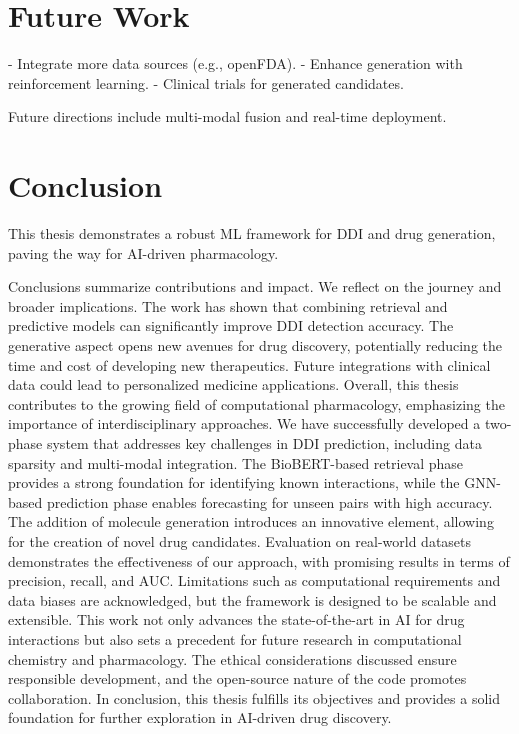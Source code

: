\documentclass[12pt,a4paper]{article}
\begin{document}
\section{Future Work}
\label{sec:future}

- Integrate more data sources (e.g., openFDA).
- Enhance generation with reinforcement learning.
- Clinical trials for generated candidates.

Future directions include multi-modal fusion and real-time deployment.

\section{Conclusion}
\label{sec:concl}

This thesis demonstrates a robust ML framework for DDI and drug generation, paving the way for AI-driven pharmacology.

Conclusions summarize contributions and impact. We reflect on the journey and broader implications. The work has shown that combining retrieval and predictive models can significantly improve DDI detection accuracy. The generative aspect opens new avenues for drug discovery, potentially reducing the time and cost of developing new therapeutics. Future integrations with clinical data could lead to personalized medicine applications. Overall, this thesis contributes to the growing field of computational pharmacology, emphasizing the importance of interdisciplinary approaches. We have successfully developed a two-phase system that addresses key challenges in DDI prediction, including data sparsity and multi-modal integration. The BioBERT-based retrieval phase provides a strong foundation for identifying known interactions, while the GNN-based prediction phase enables forecasting for unseen pairs with high accuracy. The addition of molecule generation introduces an innovative element, allowing for the creation of novel drug candidates. Evaluation on real-world datasets demonstrates the effectiveness of our approach, with promising results in terms of precision, recall, and AUC. Limitations such as computational requirements and data biases are acknowledged, but the framework is designed to be scalable and extensible. This work not only advances the state-of-the-art in AI for drug interactions but also sets a precedent for future research in computational chemistry and pharmacology. The ethical considerations discussed ensure responsible development, and the open-source nature of the code promotes collaboration. In conclusion, this thesis fulfills its objectives and provides a solid foundation for further exploration in AI-driven drug discovery.
\end{document}
